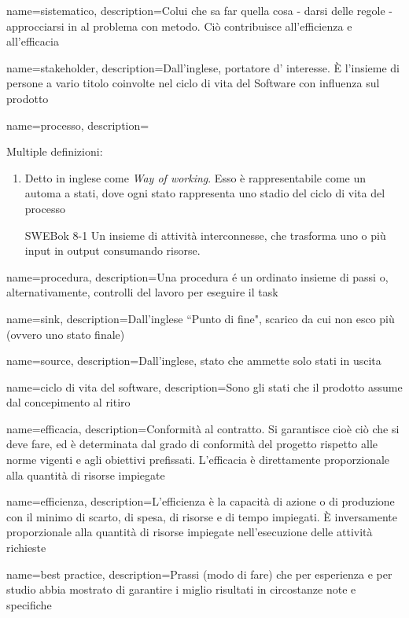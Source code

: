 {
name=sistematico,
description={Colui che sa far quella cosa - darsi delle regole - approcciarsi in al problema con metodo. Ci\`o contribuisce all'efficienza e all'efficacia}
}

{
name=stakeholder,
description={Dall'inglese, portatore d' interesse. È l'insieme di persone a vario titolo coinvolte nel ciclo di vita del Software con influenza sul prodotto}
}

{
name=processo, 
description={Multiple definizioni:
\begin{enumerate}
\item Detto in inglese come \textit{Way of working}. Esso \`e rappresentabile come un automa a stati, dove ogni stato rappresenta uno stadio del ciclo di vita del processo
\item [SWEBok 8-1] Un insieme di attività interconnesse, che trasforma uno o più input in output consumando risorse.
\end{enumerate}
}
}

{
name=procedura,
description={Una procedura \'e un ordinato insieme di passi o, alternativamente, controlli del lavoro per eseguire il task}
}


{
name=sink,
description={Dall'inglese ``Punto di fine", scarico da cui non esco pi\`u (ovvero uno stato finale)}
}

{
name=source,
description={Dall'inglese, stato che ammette solo stati in uscita}
}

{
name=ciclo di vita del software,
description={Sono gli stati che il prodotto assume dal concepimento al ritiro}
}

{
name=efficacia,
description={Conformit\`a al contratto. Si garantisce cio\`e ci\`o che si deve fare, ed \`e determinata dal grado di conformit\`a del progetto rispetto alle norme vigenti e agli obiettivi prefissati. L'efficacia \`e direttamente proporzionale alla quantit\`a di risorse impiegate}
}

{
name=efficienza,
description={L'efficienza \`e la capacit\`a di azione o di produzione con il minimo di scarto, di spesa, di risorse e di tempo impiegati. \`E inversamente proporzionale alla quantit\`a di risorse impiegate nell'esecuzione delle attivit\`a richieste}
}

{
name=best practice,
description={Prassi (modo di fare) che per esperienza e per studio abbia mostrato di garantire i miglio risultati in circostanze note e specifiche}
}

